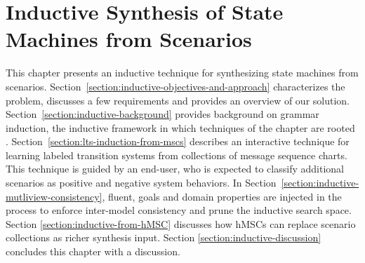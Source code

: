 \chapter{Inductive Synthesis of State Machines from Scenarios\label{chapter:inductive-synthesis}}

This chapter presents an inductive technique for synthesizing state machines from scenarios. Section~\ref{section:inductive-objectives-and-approach} characterizes the problem, discusses a few requirements and provides an overview of our solution. Section~\ref{section:inductive-background} provides background on grammar induction, the inductive framework in which techniques of the chapter are rooted \cite{Gold:1978}. Section~\ref{section:lts-induction-from-mscs} describes an interactive technique for learning labeled transition systems from collections of message sequence charts. This technique is guided by an end-user, who is expected to classify additional scenarios as positive and negative system behaviors. In Section~\ref{section:inductive-mutliview-consistency}, fluent, goals and domain properties are injected in the process to enforce inter-model consistency and prune the inductive search space. Section \ref{section:inductive-from-hMSC} discusses how hMSCs can replace scenario collections as richer synthesis input. Section \ref{section:inductive-discussion} concludes this chapter with a discussion. 








